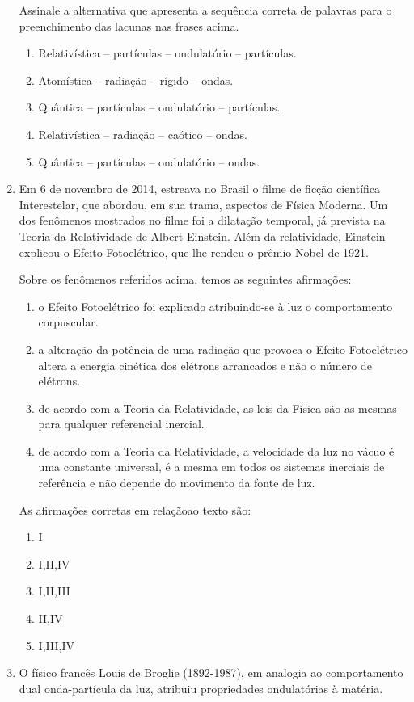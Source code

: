 \documentclass[12pt,letterpaper,fleqn]{article}
\begin{document}
\begin{enumerate}
Assinale a alternativa que apresenta a sequência correta de palavras para o preenchimento das lacunas nas frases acima.

\begin{enumerate}
    \item Relativística – partículas – ondulatório – partículas.
    \item Atomística – radiação – rígido – ondas.
    \item Quântica – partículas – ondulatório – partículas.
    \item Relativística – radiação – caótico – ondas.
    \item Quântica – partículas – ondulatório – ondas.
\end{enumerate}

\item Em 6 de novembro de 2014, estreava no Brasil o filme de ficção científica Interestelar, que abordou, em sua trama, aspectos de Física Moderna. Um dos fenômenos mostrados no filme foi a dilatação temporal, já prevista na Teoria da Relatividade de Albert Einstein. Além da relatividade, Einstein explicou o Efeito Fotoelétrico, que lhe rendeu o prêmio Nobel de 1921.

Sobre os fenômenos referidos acima, temos as seguintes afirmações:
\begin{enumerate}[I]
    \item o Efeito Fotoelétrico foi explicado atribuindo-se à luz o comportamento corpuscular.
    \item a alteração da potência de uma radiação que provoca o Efeito Fotoelétrico altera a energia cinética dos elétrons arrancados e não o número de elétrons.
    \item de acordo com a Teoria da Relatividade, as leis da Física são as mesmas para qualquer referencial inercial.
    \item de acordo com a Teoria da Relatividade, a velocidade da luz no vácuo é uma constante universal, é a mesma em todos os sistemas inerciais de referência e não depende do movimento da fonte de luz.
\end{enumerate}
As afirmações corretas em relaçãoao texto são:
\begin{enumerate}
    \item I
    \item I,II,IV
    \item I,II,III
    \item II,IV
    \item I,III,IV
\end{enumerate}
\item O físico francês Louis de Broglie (1892-1987), em analogia ao comportamento dual onda-partícula da luz, atribuiu propriedades ondulatórias à matéria.


\end{enumerate}
\end{document}
